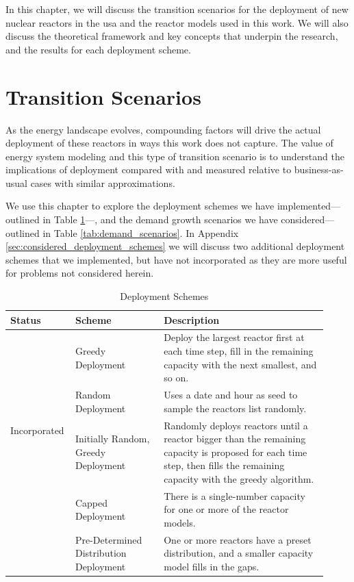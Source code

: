 In this chapter, we will discuss the transition scenarios for the deployment of new nuclear reactors in the \gls{usa} and the reactor models used in this work. We will also discuss the theoretical framework and key concepts that underpin the research, and the results for each deployment scheme.

\section{Transition Scenarios}
\label{sec:transition_scenarios}

As the energy landscape evolves, compounding
factors will drive the actual deployment of these reactors in ways this work
does not capture. The value of energy system modeling and this type of
transition scenario is to understand the implications of deployment compared
with and measured relative to business-as-usual cases with similar
approximations.

We use this chapter to explore the deployment schemes we have
implemented---outlined in Table \ref{tab:deployment_schemes}---, and the demand
growth scenarios we have considered---outlined in Table
\ref{tab:demand_scenarios}. In Appendix \ref{sec:considered_deployment_schemes}
we will discuss two additional deployment schemes that we implemented, but
have not incorporated as they are more useful for problems not considered herein.

\begin{table}[H]
    \centering
    \caption{Deployment Schemes}
    \label{tab:deployment_schemes}
    \begin{tabular}{p{0.15\linewidth} p{0.27\linewidth} p{0.50\linewidth}}
        \hline
        \textbf{Status} & \textbf{Scheme} & \textbf{Description} \\
        \hline
        \multirow{4}{*}{Incorporated} & Greedy Deployment & Deploy the largest
        reactor first at each time step, fill in the remaining capacity with
        the next smallest, and so on. \\
        & Random Deployment & Uses a date and hour as seed to sample the
        reactors list randomly. \\
        & Initially Random, Greedy Deployment & Randomly deploys reactors until
        a reactor bigger than the remaining capacity is proposed for each time step,
        then fills the remaining capacity with the greedy algorithm. \\
        \hline
        \multirow{2}{*}{Not Incorporated} & Capped Deployment & There is a
        single-number capacity for one or more of the reactor models. \\
        & Pre-Determined Distribution Deployment & One or more reactors have a
        preset distribution, and a smaller capacity model fills in the gaps. \\
        \hline
    \end{tabular}
\end{table}

